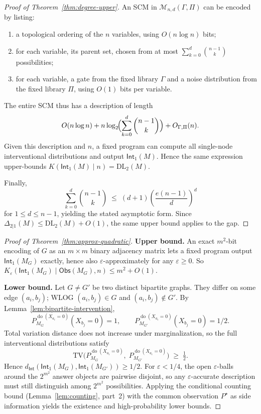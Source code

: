 \documentclass{article}
\theoremstyle{plain}
\theoremstyle{definition}
\newcommand{\calM}{\mathcal{M}}
\newcommand{\Obs}{\mathsf{Obs}}
\newcommand{\Int}{\mathsf{Int}}
\newcommand{\DL}{\mathrm{DL}}
\DeclareMathOperator{\doop}{do}
\begin{document}
\begin{proof}[Proof of Theorem~\ref{thm:degree-upper}]
An SCM in $\calM_{n,d}(\Gamma,\Pi)$ can be encoded by listing:
\begin{enumerate}
    \item a topological ordering of the $n$ variables, using $O(n \log n)$ bits;
    \item for each variable, its parent set, chosen from at most $\sum_{k=0}^{d} \binom{n-1}{k}$ possibilities;
    \item for each variable, a gate from the fixed library $\Gamma$ and a noise distribution from the fixed library $\Pi$, using $O(1)$ bits per variable.
\end{enumerate}
The entire SCM thus has a description of length
\[
    O(n \log n) + n \log_2\!\Bigl(\sum_{k=0}^{d} \binom{n-1}{k}\Bigr) + O_{\Gamma,\Pi}(n).
\]
Given this description and $n$, a fixed program can compute all single-node interventional distributions and output $\Int_1(M)$. Hence the same expression upper-bounds $K(\Int_1(M) \mid n) = \DL_2(M)$.

Finally,
\[
    \sum_{k=0}^{d} \binom{n-1}{k} \;\leq\; (d+1) \left(\frac{e(n-1)}{d}\right)^d
\]
for $1 \leq d \leq n-1$, yielding the stated asymptotic form. Since $\Delta_{2|1}(M) \leq \DL_2(M) + O(1)$, the same upper bound applies to the gap.
\end{proof}

\begin{proof}[Proof of Theorem~\ref{thm:approx-quadratic}]
\textbf{Upper bound.} An exact $m^2$-bit encoding of $G$ as an $m \times m$ binary adjacency matrix lets a fixed program output $\Int_1(M_G)$ exactly, hence also $\varepsilon$-approximately for any $\varepsilon \geq 0$. So $K_\varepsilon(\Int_1(M_G) \mid \Obs(M_G), n) \leq m^2 + O(1)$.

\textbf{Lower bound.} Let $G \neq G'$ be two distinct bipartite graphs. They differ on some edge $(a_i, b_j)$; WLOG $(a_i, b_j) \in G$ and $(a_i, b_j) \notin G'$. By Lemma~\ref{lem:bipartite-intervention},
\[
    P_{M_G}^{\doop(X_{a_i} = 0)}(X_{b_j} = 0) = 1, \qquad P_{M_{G'}}^{\doop(X_{a_i} = 0)}(X_{b_j} = 0) = 1/2.
\]
Total variation distance does not increase under marginalization, so the full interventional distributions satisfy
\[
    \mathrm{TV}\!\bigl( P_{M_G}^{\doop(X_{a_i} = 0)},\; P_{M_{G'}}^{\doop(X_{a_i} = 0)} \bigr) \;\geq\; \tfrac{1}{2}.
\]
Hence $d_{\Int}(\Int_1(M_G), \Int_1(M_{G'})) \geq 1/2$. For $\varepsilon < 1/4$, the open $\varepsilon$-balls around the $2^{m^2}$ answer objects are pairwise disjoint, so any $\varepsilon$-accurate description must still distinguish among $2^{m^2}$ possibilities. Applying the conditional counting bound (Lemma~\ref{lem:counting}, part~2) with the common observation $P^\star$ as side information yields the existence and high-probability lower bounds.
\end{proof}
\end{document}
